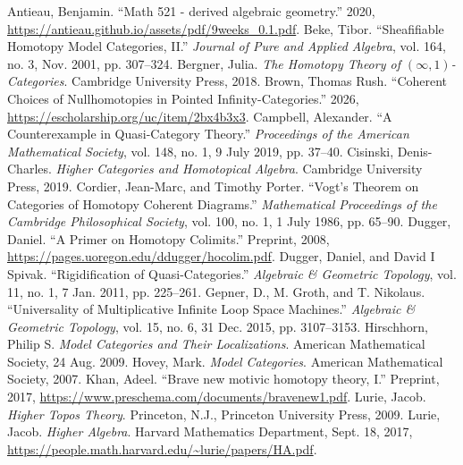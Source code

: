 \documentclass{tac}
\begin{document}
\begin{references*} \normalsize %
 Antieau, Benjamin. ``Math 521 - derived algebraic geometry.'' 2020, \url{https://antieau.github.io/assets/pdf/9weeks_0.1.pdf}.
 Beke, Tibor. ``Sheafifiable Homotopy Model Categories, II.” \emph{Journal of Pure and Applied Algebra}, vol. 164, no. 3, Nov. 2001, pp. 307–324.
 Bergner, Julia. \emph{The Homotopy Theory of $(\infty , 1)$-Categories}.  Cambridge University Press, 2018.
 Brown, Thomas Rush.  ``Coherent Choices of Nullhomotopies in Pointed Infinity-Categories.'' 2026, \url{https://escholarship.org/uc/item/2bx4b3x3}.
 Campbell, Alexander. ``A Counterexample in Quasi-Category Theory.” \emph{Proceedings of the American Mathematical Society}, vol. 148, no. 1, 9 July 2019, pp. 37–40.
 Cisinski, Denis-Charles. \emph{Higher Categories and Homotopical Algebra}. Cambridge University Press, 2019.
 Cordier, Jean-Marc, and Timothy Porter. ``Vogt’s Theorem on Categories of Homotopy Coherent Diagrams.” \emph{Mathematical Proceedings of the Cambridge Philosophical Society}, vol. 100, no. 1, 1 July 1986, pp. 65–90.
 Dugger, Daniel. ``A Primer on Homotopy Colimits.” Preprint, 2008, \url{https://pages.uoregon.edu/ddugger/hocolim.pdf}.
 Dugger, Daniel, and David I Spivak. ``Rigidification of Quasi-Categories.” \emph{Algebraic \& Geometric Topology}, vol. 11, no. 1, 7 Jan. 2011, pp. 225–261.
 Gepner, D., M. Groth, and T. Nikolaus. ``Universality of Multiplicative Infinite Loop Space Machines.” \emph{Algebraic \& Geometric Topology}, vol. 15, no. 6, 31 Dec. 2015, pp. 3107–3153.
 Hirschhorn, Philip S. \emph{Model Categories and Their Localizations}. American Mathematical Society, 24 Aug. 2009.
 Hovey, Mark. \emph{Model Categories}. American Mathematical Society, 2007.
 Khan, Adeel.  ``Brave new motivic homotopy theory, I.'' Preprint, 2017, \url{https://www.preschema.com/documents/bravenew1.pdf}.
 Lurie, Jacob. \emph{Higher Topos Theory}. Princeton, N.J., Princeton University Press, 2009.
 Lurie, Jacob. \emph{Higher Algebra}. Harvard Mathematics Department, Sept. 18, 2017, \url{https://people.math.harvard.edu/~lurie/papers/HA.pdf}.

\end{references*}
\end{document}
